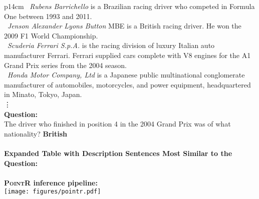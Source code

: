\documentclass[11pt]{article}
\newcommand\hqa{\textsc{HybridQA}\xspace}
\newcommand{\pointr}{\textsc{PointR}\xspace}
\begin{document}
\begin{figure*}[th]
\begin{tabular}{p{14cm}}
~\emph{Rubens Barrichello} is a Brazilian racing driver who competed in Formula One between 1993 and 2011. \\
~\emph{Jenson Alexander Lyons Button} MBE is a British racing driver. He won the 2009 F1 World Championship. \\
~\emph{Scuderia Ferrari S.p.A.} is the racing division of luxury Italian auto manufacturer Ferrari. Ferrari supplied cars complete with V8 engines for the A1 Grand Prix series from the 2004 season. \\
~\emph{Honda Motor Company, Ltd} is a Japanese public multinational conglomerate manufacturer of automobiles, motorcycles, and power equipment, headquartered in Minato, Tokyo, Japan. \\
\hspace{7cm}\vdots \\
\textbf{Question:} \\
The driver who finished in position 4 in the 2004 Grand Prix was of what nationality? \textbf{British} \\
\vspace{-1mm}
\hspace{7cm} \\
\vspace{-1mm}
\textbf{Expanded Table with  Description Sentences Most Similar to the Question:} \\
\\
\vspace{5pt}
\textbf{\pointr inference pipeline:} \\
\centering
\texttt{[image: figures/pointr.pdf]}
\end{tabular}\caption{An example from the \hqa dataset processed by \pointr. The first paragraph in the Wikipedia page for each underlined entity was available to the dataset authors. 
We expand the text in the cells with this descriptions for the top- most relevant sentences, as shown in the second table, and train a model to find the cell containing or linking to the answer (marked here with a ). The goal is to provide the model with all the context needed to locate the answer. A second model extracts a span from the selected cell content and linked text.}
\label{fig:hybridqa_example}
\end{figure*}
 
\end{document}
